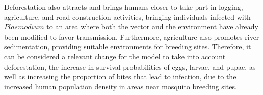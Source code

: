 \documentclass[a4paper,fleqn]{cas-dc}
\begin{document}
Deforestation also attracts and brings humans closer 
to take part in logging, agriculture, and road construction 
activities, bringing individuals infected with $Plasmodium$ to 
an area where both the vector and the environment have already 
been modified to favor transmission. Furthermore, agriculture 
also promotes river sedimentation, providing suitable environments 
for breeding sites. Therefore, it can be considered a relevant 
change for the model to take into account deforestation, the 
increase in survival probabilities of eggs, larvae, and pupae, 
as well as increasing the proportion of bites that lead to infection, 
due to the increased human population density in areas near mosquito 
breeding sites.
\end{document}
